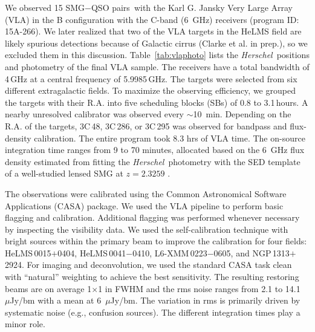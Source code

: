 \documentclass[iop,revtex4,twocolumn,apj,numberedappendix,appendixfloats]{emulateapj}
\newcommand{\hers}{{\it Herschel}}
\newcommand{\um}{$\mu$m}
\newcommand{\uJy}{$\mu$Jy}
\newcommand{\sqps}{SMG$-$QSO pairs}
\begin{document}
We observed 15 \sqps\ with the Karl G. Jansky Very Large Array (VLA) in the B configuration with the C-band (6~GHz) receivers (program ID: 15A-266). We later realized that two of the VLA targets in the HeLMS field are likely spurious detections because of Galactic cirrus (Clarke et al. in prep.), so we excluded them in this discussion. Table~\ref{tab:vlaphoto} lists the \hers\ positions and photometry of the final VLA sample. The receivers have a total bandwidth of 4\,GHz at a central frequency of 5.9985\,GHz. The targets were selected from six different extragalactic fields. To maximize the observing efficiency, we grouped the targets with their R.A. into five scheduling blocks (SBs) of 0.8 to 3.1\,hours. A nearby unresolved calibrator was observed every $\sim$10~min. Depending on the R.A. of the targets, 3C\,48, 3C\,286, or 3C\,295 was observed for bandpass and flux-density calibration. The entire program took 8.3 hrs of VLA time. The on-source integration time ranges from 9 to 70 minutes, allocated based on the 6~GHz flux density estimated from fitting the \hers\ photometry with the SED template of a well-studied lensed SMG at $z = 2.3259$ \citep[SMM~J2135-0102, aka. the ``Eyelash'';][]{Swinbank10b}.

The observations were calibrated using the Common Astronomical Software Applications (CASA) package. We used the VLA pipeline to perform basic flagging and calibration. Additional flagging was performed whenever necessary by inspecting the visibility data. We used the self-calibration technique with bright sources within the primary beam to improve the calibration for four fields: HeLMS\,0015$+$0404, HeLMS\,0041$-$0410, L6-XMM\,0223$-$0605, and NGP\,1313$+$2924. For imaging and deconvolution, we used the standard CASA task {\sc clean} with ``natural'' weighting to achieve the best sensitivity. The resulting restoring beams are on average 1$\times$1 in FWHM and the rms noise ranges from 2.1 to 14.1~\uJy/bm with a mean at 6~\uJy/bm. The variation in rms is primarily driven by systematic noise (e.g., confusion sources). The different integration times play a minor role. 


\end{document}
